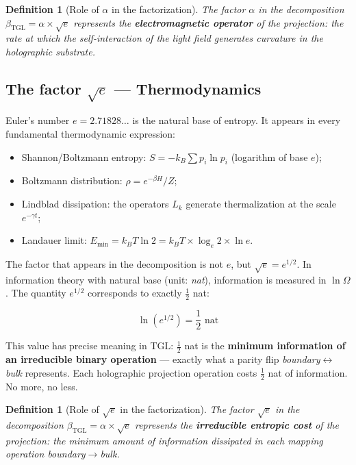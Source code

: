 \documentclass[12pt,a4paper,twoside]{article}
\newtheorem{definition}[theorem]{Definition}
\newcommand{\betatgl}{\beta_{\!\scriptscriptstyle\mathrm{TGL}}}
\newcommand{\boundary}{\textit{boundary}}
\newcommand{\bulk}{\textit{bulk}}
\begin{document}
\begin{definition}[Role of $\alpha$ in the factorization]
The factor $\alpha$ in the decomposition $\betatgl = \alpha \times \sqrt{e}$ represents the \textbf{electromagnetic operator} of the projection: the rate at which the self-interaction of the light field generates curvature in the holographic substrate.
\end{definition}

\subsection{The factor $\sqrt{e}$ --- Thermodynamics}

Euler's number $e = 2.71828\ldots$ is the natural base of entropy. It appears in every fundamental thermodynamic expression:

\begin{itemize}[nosep]
\item Shannon/Boltzmann entropy: $S = -k_B \sum p_i \ln p_i$ (logarithm of base $e$);
\item Boltzmann distribution: $\rho = e^{-\beta H} / Z$;
\item Lindblad dissipation: the operators $L_k$ generate thermalization at the scale $e^{-\gamma t}$;
\item Landauer limit: $E_{\min} = k_B T \ln 2 = k_B T \times \log_e 2 \times \ln e$.
\end{itemize}

The factor that appears in the decomposition is not $e$, but $\sqrt{e} = e^{1/2}$. In information theory with natural base (unit: \textit{nat}), information is measured in $\ln \Omega$. The quantity $e^{1/2}$ corresponds to exactly $\frac{1}{2}$ nat:

\begin{equation}
\ln(e^{1/2}) = \frac{1}{2} \text{ nat}
\end{equation}

This value has precise meaning in TGL: $\frac{1}{2}$ nat is the \textbf{minimum information of an irreducible binary operation} --- exactly what a parity flip \boundary$\leftrightarrow$\bulk{} represents. Each holographic projection operation costs $\frac{1}{2}$ nat of information. No more, no less.

\begin{definition}[Role of $\sqrt{e}$ in the factorization]
The factor $\sqrt{e}$ in the decomposition $\betatgl = \alpha \times \sqrt{e}$ represents the \textbf{irreducible entropic cost} of the projection: the minimum amount of information dissipated in each mapping operation \boundary$\to$\bulk.
\end{definition}
\end{document}

